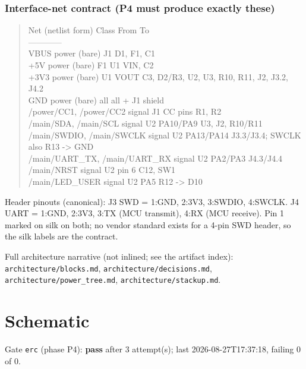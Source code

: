 \documentclass[11pt,a4paper]{article}
\begin{document}
\subsubsection*{Interface-net contract (P4 must produce exactly these)}
\begin{quote}\small\ttfamily\raggedright
\textbar{} Net (netlist form) \textbar{} Class \textbar{} From \textbar{} To \textbar{}\\
\textbar{}---\textbar{}---\textbar{}---\textbar{}---\textbar{}\\
\textbar{} VBUS \textbar{} power (bare) \textbar{} J1 \textbar{} D1, F1, C1 \textbar{}\\
\textbar{} +5V \textbar{} power (bare) \textbar{} F1 \textbar{} U1 VIN, C2 \textbar{}\\
\textbar{} +3V3 \textbar{} power (bare) \textbar{} U1 VOUT \textbar{} C3, D2/R3, U2, U3, R10, R11, J2, J3.2, J4.2 \textbar{}\\
\textbar{} GND \textbar{} power (bare) \textbar{} all \textbar{} all + J1 shield \textbar{}\\
\textbar{} /power/CC1, /power/CC2 \textbar{} signal \textbar{} J1 CC pins \textbar{} R1, R2 \textbar{}\\
\textbar{} /main/SDA, /main/SCL \textbar{} signal \textbar{} U2 PA10/PA9 \textbar{} U3, J2, R10/R11 \textbar{}\\
\textbar{} /main/SWDIO, /main/SWCLK \textbar{} signal \textbar{} U2 PA13/PA14 \textbar{} J3.3/J3.4; SWCLK also R13 -\textgreater{} GND \textbar{}\\
\textbar{} /main/UART\_TX, /main/UART\_RX \textbar{} signal \textbar{} U2 PA2/PA3 \textbar{} J4.3/J4.4 \textbar{}\\
\textbar{} /main/NRST \textbar{} signal \textbar{} U2 pin 6 \textbar{} C12, SW1 \textbar{}\\
\textbar{} /main/LED\_USER \textbar{} signal \textbar{} U2 PA5 \textbar{} R12 -\textgreater{} D10 \textbar{}
\end{quote}
Header pinouts (canonical): J3 SWD = 1:GND, 2:3V3, 3:SWDIO, 4:SWCLK. J4 UART = 1:GND, 2:3V3, 3:TX (MCU transmit), 4:RX (MCU receive). Pin 1 marked on silk on both; no vendor standard exists for a 4-pin SWD header, so the silk labels are the contract.

Full architecture narrative (not inlined; see the artifact index): \texttt{architecture/blocks.md}, \texttt{architecture/decisions.md}, \texttt{architecture/power\_tree.md}, \texttt{architecture/stackup.md}.
\section{Schematic}
Gate \texttt{erc} (phase P4): \textbf{pass} after 3 attempt(s); last 2026-08-27T17:37:18, failing 0 of 0.
\end{document}
